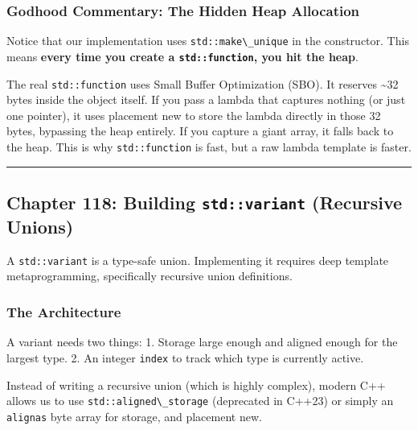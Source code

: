 \hypertarget{godhood-commentary-the-hidden-heap-allocation}{%
\subsubsection{Godhood Commentary: The Hidden Heap
Allocation}\label{godhood-commentary-the-hidden-heap-allocation}}

Notice that our implementation uses
\passthrough{\lstinline!std::make\_unique!} in the constructor. This
means \textbf{every time you create a
\passthrough{\lstinline!std::function!}, you hit the heap}.

The real \passthrough{\lstinline!std::function!} uses Small Buffer
Optimization (SBO). It reserves \textasciitilde32 bytes inside the
object itself. If you pass a lambda that captures nothing (or just one
pointer), it uses placement new to store the lambda directly in those 32
bytes, bypassing the heap entirely. If you capture a giant array, it
falls back to the heap. This is why
\passthrough{\lstinline!std::function!} is fast, but a raw lambda
template is faster.

\begin{center}\rule{0.5\linewidth}{0.5pt}\end{center}

\hypertarget{chapter-118-building-stdvariant-recursive-unions}{%
\subsection{\texorpdfstring{Chapter 118: Building \texttt{std::variant}
(Recursive
Unions)}{Chapter 118: Building std::variant (Recursive Unions)}}\label{chapter-118-building-stdvariant-recursive-unions}}

A \passthrough{\lstinline!std::variant!} is a type-safe union.
Implementing it requires deep template metaprogramming, specifically
recursive union definitions.

\hypertarget{the-architecture-2}{%
\subsubsection{The Architecture}\label{the-architecture-2}}

A variant needs two things: 1. Storage large enough and aligned enough
for the largest type. 2. An integer \passthrough{\lstinline!index!} to
track which type is currently active.

Instead of writing a recursive union (which is highly complex), modern
C++ allows us to use \passthrough{\lstinline!std::aligned\_storage!}
(deprecated in C++23) or simply an \passthrough{\lstinline!alignas!}
byte array for storage, and placement new.

